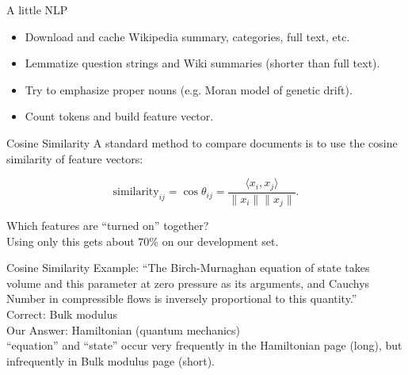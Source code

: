 \documentclass{beamer}
\begin{document}
\begin{frame}{A little NLP}
   \begin{itemize}
      \item Download and cache Wikipedia summary, categories, full text, etc.
      \item Lemmatize question strings and Wiki summaries (shorter than full text).
      \item Try to emphasize proper nouns (e.g. {\color{blue} Moran model} of genetic drift).
      \item Count tokens and build feature vector.
   \end{itemize}
\end{frame}

\begin{frame}{Cosine Similarity}
  A standard method to compare documents is to use the cosine similarity of feature vectors:

  \[ \text{similarity}_{ij} = \cos\theta_{ij} = \dfrac{\langle x_i, x_j\rangle}{\|x_i\| \|x_j\|}. \] 

  Which features are ``turned on'' together?\\

  Using only this gets about $70\%$ on our development set.
\end{frame}


\begin{frame}{Cosine Similarity}
   Example: ``The Birch-Murnaghan equation of state takes volume and this parameter at zero pressure as its arguments, and Cauchys Number in compressible flows is inversely proportional to this quantity.''\\[1em]
   {\color{green}Correct}: Bulk modulus\\
   {\color{red}Our Answer}: Hamiltonian (quantum mechanics)\\[1em]

   ``equation'' and ``state'' occur very frequently in the Hamiltonian page (long), but infrequently in Bulk modulus page (short).\\
\end{frame}
\end{document}
